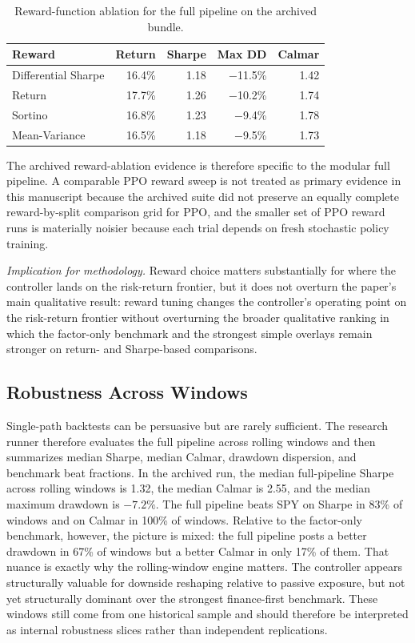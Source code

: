 \documentclass[10pt,twocolumn]{article}
\begin{document}
\begin{table}[t]
\centering
\small
\caption{Reward-function ablation for the full pipeline on the archived bundle.}
\label{tab:reward_ablation}
\begin{tabular}{@{} l r r r r @{}}
\toprule
\textbf{Reward} & \textbf{Return} & \textbf{Sharpe} & \textbf{Max DD} & \textbf{Calmar} \\
\midrule
Differential Sharpe & 16.4\% & 1.18 & $-$11.5\% & 1.42 \\
Return              & 17.7\% & 1.26 & $-$10.2\% & 1.74 \\
Sortino             & 16.8\% & 1.23 & $-$9.4\%  & 1.78 \\
Mean-Variance       & 16.5\% & 1.18 & $-$9.5\%  & 1.73 \\
\bottomrule
\end{tabular}
\end{table}

The archived reward-ablation evidence is therefore specific to the modular full
pipeline. A comparable PPO reward sweep is not treated as primary evidence in
this manuscript because the archived suite did not preserve an equally complete
reward-by-split comparison grid for PPO, and the smaller set of PPO reward runs
is materially noisier because each trial depends on fresh stochastic policy
training.

\noindent\textit{Implication for methodology.} Reward choice matters
substantially for where the controller lands on the risk-return frontier, but it
does not overturn the paper's main qualitative result: reward tuning changes the
controller's operating point on the risk-return frontier without overturning the
broader qualitative ranking in which the factor-only benchmark and the strongest
simple overlays remain stronger on return- and Sharpe-based comparisons.

\subsection{Robustness Across Windows}

Single-path backtests can be persuasive but are rarely sufficient. The research
runner therefore evaluates the full pipeline across rolling windows and then
summarizes median Sharpe, median Calmar, drawdown dispersion, and benchmark beat
fractions. In the archived run, the median full-pipeline Sharpe across rolling
windows is 1.32, the median Calmar is 2.55, and the median maximum drawdown is
$-7.2\%$. The full pipeline beats SPY on Sharpe in 83\% of windows and on
Calmar in 100\% of windows. Relative to the factor-only benchmark, however, the
picture is mixed: the full pipeline posts a better drawdown in 67\% of windows
but a better Calmar in only 17\% of them. That nuance is exactly why the
rolling-window engine matters. The controller appears structurally valuable for
downside reshaping relative to passive exposure, but not yet structurally
dominant over the strongest finance-first benchmark.
These windows still come from one historical sample and should therefore be
interpreted as internal robustness slices rather than independent replications.
\end{document}
